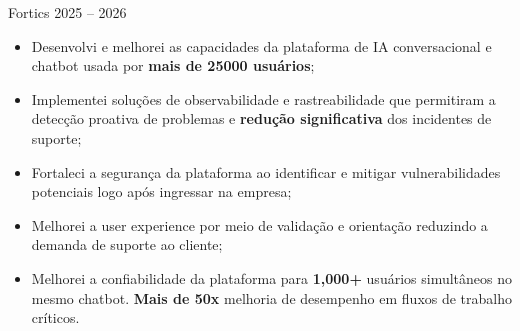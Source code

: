 
\cvitem%
{}
{}
{Fortics}
{2025 -- 2026}


\begin{itemize}[leftmargin=1em, itemsep=-0.1em, topsep=-0.1em]
  \item {}
        {Desenvolvi e melhorei as capacidades da plataforma de IA conversacional e chatbot usada por \textbf{mais de 25000 usuários};}
  \item {}
        {Implementei soluções de observabilidade e rastreabilidade que permitiram a detecção proativa de problemas e \textbf{redução significativa} dos incidentes de suporte;}
  \item {}
        {Fortaleci a segurança da plataforma ao identificar e mitigar vulnerabilidades potenciais logo após ingressar na empresa;}
  \item {}
        {Melhorei a user experience por meio de validação e orientação reduzindo a demanda de suporte ao cliente;}
  \item {}
        {Melhorei a confiabilidade da plataforma para \textbf{1,000+} usuários simultâneos no mesmo chatbot. \textbf{Mais de 50x} melhoria de desempenho em fluxos de trabalho críticos.}
\end{itemize}
\vspace{0.5em}


